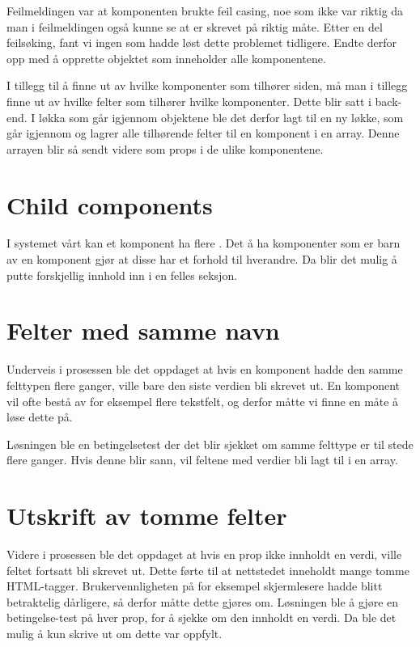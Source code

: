 Feilmeldingen var at komponenten brukte feil casing, noe som ikke var riktig da man i feilmeldingen også kunne se at  er skrevet på riktig måte. Etter en del feilsøking, fant vi ingen som hadde løst dette problemet tidligere. Endte derfor opp med å opprette objektet som inneholder alle komponentene. 

I tillegg til å finne ut av hvilke komponenter som tilhører siden, må man i tillegg finne ut av hvilke felter som tilhører hvilke komponenter. Dette blir satt i back-end. I løkka som går igjennom objektene ble det derfor lagt til en ny løkke, som går igjennom og lagrer alle tilhørende felter til en komponent i en array. Denne arrayen blir så sendt videre som props i de ulike komponentene.

\section{Child components}
I systemet vårt kan et komponent ha flere . Det å ha komponenter som er barn av en komponent gjør at disse har et forhold til hverandre. Da blir det mulig å putte forskjellig innhold inn i en felles seksjon.

\section{Felter med samme navn}
Underveis i prosessen ble det oppdaget at hvis en komponent hadde den samme felttypen flere ganger, ville bare den siste verdien bli skrevet ut. En komponent vil ofte bestå av for eksempel flere tekstfelt, og derfor måtte vi finne en måte å løse dette på.

Løsningen ble en betingelsetest der det blir sjekket om samme felttype er til stede flere ganger. Hvis denne blir sann, vil feltene med verdier bli lagt til i en array. 

\section{Utskrift av tomme felter}
Videre i prosessen ble det oppdaget at hvis en prop ikke innholdt en verdi, ville feltet fortsatt bli skrevet ut. Dette førte til at nettstedet inneholdt mange tomme HTML-tagger. Brukervennligheten på for eksempel skjermlesere hadde blitt betraktelig dårligere, så derfor måtte dette gjøres om. Løsningen ble å gjøre en betingelse-test på hver prop, for å sjekke om den innholdt en verdi. Da ble det mulig å kun skrive ut om dette var oppfylt.

